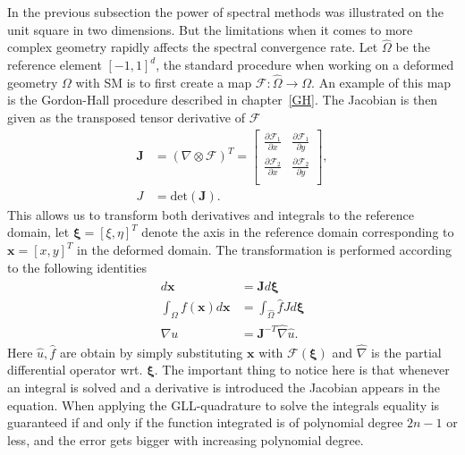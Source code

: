 In the previous subsection the power of spectral methods was illustrated on the unit square in two dimensions.
But the limitations when it comes to more complex geometry rapidly affects the spectral convergence rate. 
Let $\hat{\Omega}$ be the reference element $[-1,1]^d$,
the standard procedure when working on a deformed geometry $\Omega$ with SM is to first create a map 
$\mathcal{F}:\hat{\Omega}\rightarrow\Omega$. An example of this map is the Gordon-Hall procedure 
described in chapter~\ref{GH}.
The Jacobian is then given as the transposed tensor derivative of $\mathcal{F}$
\begin{align}
    \mathbf{J} &= (\nabla \otimes \mathcal{F})^T =
\begin{bmatrix}
    \frac{\partial \mathcal{F}_1}{\partial x} &  \frac{\partial \mathcal{F}_1}{\partial y}  \\ 	
	\frac{\partial \mathcal{F}_2}{\partial x} &  \frac{\partial \mathcal{F}_2}{\partial y} \\ 	
\end{bmatrix},\\
J &= \text{det}(\mathbf{J}).
    \label{eq:jaobian}
\end{align}
This allows us to transform both derivatives and integrals to the reference domain, let $\boldsymbol\xi = [\xi,\eta]^T$ denote the axis in the reference 
domain corresponding to $\mathbf{x} = [x,y]^T$ in the deformed domain. The transformation is performed according to the following identities
\begin{align}
    \begin{split}
        d\mathbf{x} &= \mathbf{J}d\boldsymbol\xi \\
        \int_{\Omega}f(\mathbf{x})d\mathbf{x} &= \int_{\hat\Omega}\hat f J d\boldsymbol\xi \\
        \nabla u &= \mathbf{J}^{-T}\hat\nabla \hat u.
    \end{split}
    \label{eq:transforms}
\end{align}
Here $\hat u,\hat f$ are obtain by simply substituting $\mathbf{x}$ with $\mathcal{F}(\boldsymbol{\xi})$ and $\hat \nabla $ is the partial 
differential operator wrt. $\boldsymbol\xi$. The important thing to notice here is that whenever an integral is solved and a derivative is 
introduced the Jacobian appears in the equation. When applying the GLL-quadrature to solve the integrals equality is guaranteed if and 
only if the function integrated is of polynomial degree $2n-1$ or less, 
and the error gets bigger with increasing polynomial degree.

